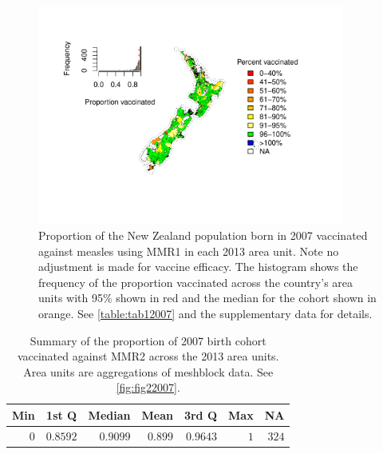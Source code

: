 \documentclass{article}
\begin{document}
\begin{figure}
\begin{center}
\includegraphics[width=0.9\textwidth]{nir_census_MMR1_NIR_2007.pdf}
\end{center}
    \caption{Proportion of the New Zealand population born in 2007 vaccinated against measles using MMR1 in each 2013 area unit. Note no adjustment is made for vaccine efficacy. The histogram shows the frequency of the proportion vaccinated across the country's area units with 95\% shown in red and the median for the cohort shown in orange. See \autoref{table:tab12007} and the supplementary data for details.}
\label{fig:fig12007}
\end{figure}

 \vspace{5mm} %
\begin{table}
\begin{center}
\begin{tabular}{rrrrrrr}
\hline\hline
\multicolumn{1}{c}{Min}&\multicolumn{1}{c}{1st Q}&\multicolumn{1}{c}{Median}&\multicolumn{1}{c}{Mean}&\multicolumn{1}{c}{3rd Q}&\multicolumn{1}{c}{Max}&\multicolumn{1}{c}{NA}\tabularnewline
\hline
$0$&$0.8592$&$0.9099$&$0.899$&$0.9643$&$1$&$324$\tabularnewline
\hline
\end{tabular}\end{center}\caption{Summary of the proportion of 2007 birth cohort vaccinated against MMR2 across the 2013 area units. Area units are aggregations of meshblock data. See \autoref{fig:fig22007}.}
\label{table:tab22007}
\end{table}
\end{document}
